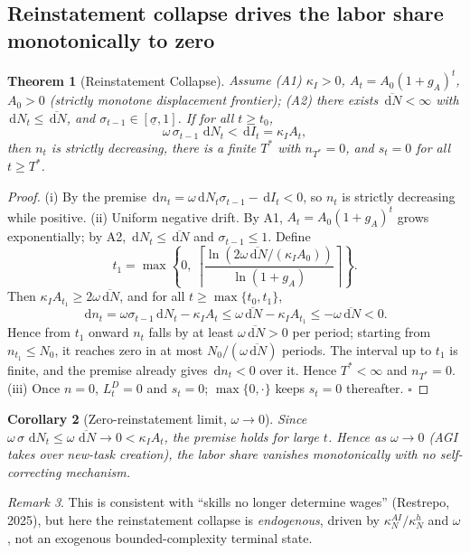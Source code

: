 \documentclass[review,12pt]{elsarticle}
\theoremstyle{plain}
\newtheorem{theorem}{Theorem}
\newtheorem{corollary}[theorem]{Corollary}
\theoremstyle{definition}
\theoremstyle{remark}
\newtheorem{remark}[theorem]{Remark}
\newcommand{\dd}{\,\mathrm{d}}
\begin{document}
\subsection{Reinstatement collapse drives the labor share monotonically to zero}
\begin{theorem}[Reinstatement Collapse]
\label{thm1}
Assume (A1) $\kappa_I>0$, $A_t=A_0(1+g_A)^t$, $A_0>0$ (strictly monotone displacement frontier); (A2) there exists $\overline{\dd N}<\infty$ with $\dd N_t\le\overline{\dd N}$, and $\sigma_{t-1}\in[\underline{\sigma},1]$. If for all $t\ge t_0$,
\[
\omega\,\sigma_{t-1}\,\dd N_t<\dd I_t=\kappa_I A_t,
\]
then $n_t$ is strictly decreasing, there is a finite $T^*$ with $n_{T^*}=0$, and $s_t=0$ for all $t\ge T^*$.
\end{theorem}
\begin{proof}
(i) By the premise $\dd n_t=\omega\dd N_t\sigma_{t-1}-\dd I_t<0$, so $n_t$ is strictly decreasing while positive.
(ii) Uniform negative drift. By A1, $A_t=A_0(1+g_A)^t$ grows exponentially; by A2, $\dd N_t\le\overline{\dd N}$ and $\sigma_{t-1}\le1$. Define
\[
t_1=\max\!\left\{0,\ \left\lceil\frac{\ln(2\omega\overline{\dd N}/(\kappa_I A_0))}{\ln(1+g_A)}\right\rceil\right\}.
\]
Then $\kappa_I A_{t_1}\ge2\omega\overline{\dd N}$, and for all $t\ge\max\{t_0,t_1\}$,
\[
\dd n_t=\omega\sigma_{t-1}\dd N_t-\kappa_I A_t\le\omega\overline{\dd N}-\kappa_I A_{t_1}\le-\omega\overline{\dd N}<0.
\]
Hence from $t_1$ onward $n_t$ falls by at least $\omega\overline{\dd N}>0$ per period; starting from $n_{t_1}\le N_0$, it reaches zero in at most $N_0/(\omega\overline{\dd N})$ periods. The interval up to $t_1$ is finite, and the premise already gives $\dd n_t<0$ over it. Hence $T^*<\infty$ and $n_{T^*}=0$.
(iii) Once $n=0$, $L_t^D=0$ and $s_t=0$; $\max\{0,\cdot\}$ keeps $s_t=0$ thereafter. $\square$
\end{proof}

\begin{corollary}[Zero-reinstatement limit, $\omega\to0$]
\label{cor1}
Since $\omega\,\sigma\,\dd N_t\le\omega\,\overline{\dd N}\to0<\kappa_I A_t$, the premise holds for large $t$. Hence as $\omega\to0$ (AGI takes over new-task creation), the labor share vanishes monotonically with \emph{no self-correcting mechanism}.
\end{corollary}

\begin{remark}
This is consistent with ``skills no longer determine wages'' (Restrepo, 2025), but here the reinstatement collapse is \emph{endogenous}, driven by $\kappa_N^{AI}/\kappa_N^h$ and $\omega$, not an exogenous bounded-complexity terminal state.
\end{remark}
\end{document}
